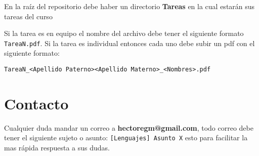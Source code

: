 \documentclass{article}
\begin{document}
En la raíz del repositorio debe haber un directorio \textbf{Tareas}
en la cual estarán sus tareas del curso

Si la tarea es en equipo el nombre del archivo debe tener el siguiente formato \texttt{TareaN.pdf}. Si la tarea es individual entonces cada uno debe subir un pdf con el siguiente formato:
\begin{verbatim}
TareaN_<Apellido Paterno><Apellido Materno>_<Nombres>.pdf
\end{verbatim}

\section{Contacto}

Cualquier duda mandar un correo a \textbf{hectoregm@gmail.com}, todo correo debe tener el siguiente sujeto o asunto: \texttt{[Lenguajes] Asunto X} esto para facilitar la mas rápida respuesta a sus dudas.
\end{document}
